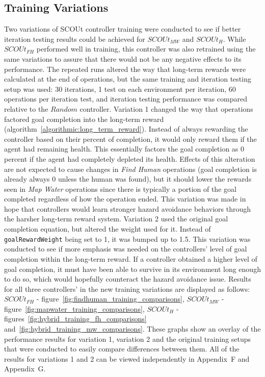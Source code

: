 \subsection{Training Variations} \label{subsec:training_variations}
Two variations of SCOUt controller training were conducted to see if better iteration testing results could be achieved for $SCOUt_{MW}$ and $SCOUt_{H}$.
While $SCOUt_{FH}$ performed well in training, this controller was also retrained using the same variations to assure that there would not be any negative effects to its performance.
The repeated runs altered the way that long-term rewards were calculated at the end of operations, but the same training and iteration testing setup was used: 30 iterations, 1 test on each environment per iteration, 60 operations per iteration test, and iteration testing performance was compared relative to the $Random$ controller.
Variation 1 changed the way that operations factored goal completion into the long-term reward (algorithm~\ref{algorithmic:long_term_reward}).
Instead of always rewarding the controller based on their percent of completion, it would only reward them if the agent had remaining health.
This essentially factors the goal completion as 0 percent if the agent had completely depleted its health.
Effects of this alteration are not expected to cause changes in \textit{Find Human} operations (goal completion is already always 0 unless the human was found), but it should lower the rewards seen in \textit{Map Water} operations since there is typically a portion of the goal completed regardless of how the operation ended.
This variation was made in hope that controllers would learn stronger hazard avoidance behaviors through the harsher long-term reward system.
Variation 2 used the original goal completion equation, but altered the weight used for it.
Instead of \texttt{goalRewardWeight} being set to 1, it was bumped up to 1.5.
This variation was conducted to see if more emphasis was needed on the controllers' level of goal completion within the long-term reward.
If a controller obtained a higher level of goal completion, it must have been able to survive in its environment long enough to do so, which would hopefully counteract the hazard avoidance issue.
Results for all three controllers' in the new training variations are displayed as follows: $SCOUt_{FH}$ - figure~\ref{fig:findhuman_training_comparisons}, $SCOUt_{MW}$ - figure~\ref{fig:mapwater_training_comparisons}, $SCOUt_{H}$ - figures~\ref{fig:hybrid_training_fh_comparisons} and~\ref{fig:hybrid_training_mw_comparisons}.
These graphs show an overlay of the performance results for variation 1, variation 2 and the original training setups that were conducted to easily compare differences between them.
All of the results for variations 1 and 2 can be viewed independently in Appendix~F and Appendix~G.

